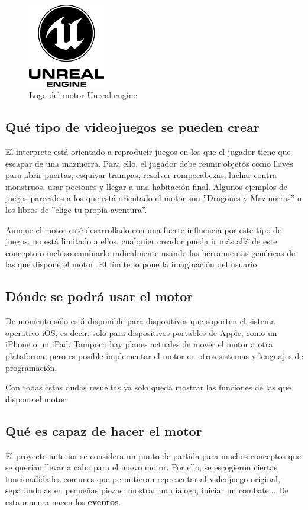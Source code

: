 \begin{figure}[h]
	\caption{Logo del motor Unreal engine}
	\centering
	\includegraphics[width=0.3\textwidth]{include/unrealEngineLogo.png}
\end{figure}

\subsection{Qué tipo de videojuegos se pueden crear}
El interprete está orientado a reproducir juegos en los que el jugador tiene que escapar de una mazmorra. Para ello, el jugador debe reunir objetos como llaves para abrir puertas, esquivar trampas, resolver rompecabezas, luchar contra monstruos, usar pociones y llegar a una habitación final.
Algunos ejemplos de juegos parecidos a los que está orientado el motor son ''Dragones y Mazmorras'' o los libros de ''elige tu propia aventura''.

Aunque el motor esté desarrollado con una fuerte influencia por este tipo de juegos, no está limitado a ellos, cualquier creador pueda ir más allá de este concepto o incluso cambiarlo radicalmente usando las herramientas genéricas de las que dispone el motor. El límite lo pone la imaginación del usuario.

\subsection{Dónde se podrá usar el motor}
De momento sólo está disponible para dispositivos que soporten el sistema operativo iOS, es decir, solo para dispositivos portables de Apple, como un iPhone o un iPad.
Tampoco hay planes actuales de mover el motor a otra plataforma, pero es posible implementar el motor en otros sistemas y lenguajes de programación.

Con todas estas dudas resueltas ya solo queda mostrar las funciones de las que dispone el motor.

\subsection{Qué es capaz de hacer el motor}
El proyecto anterior se considera un punto de partida para muchos conceptos que se querían llevar a cabo para el nuevo motor. Por ello, se escogieron ciertas funcionalidades comunes que permitieran representar al videojuego original, separandolas en pequeñas piezas: mostrar un diálogo, iniciar un combate...
De esta manera nacen los \textbf{eventos}.

